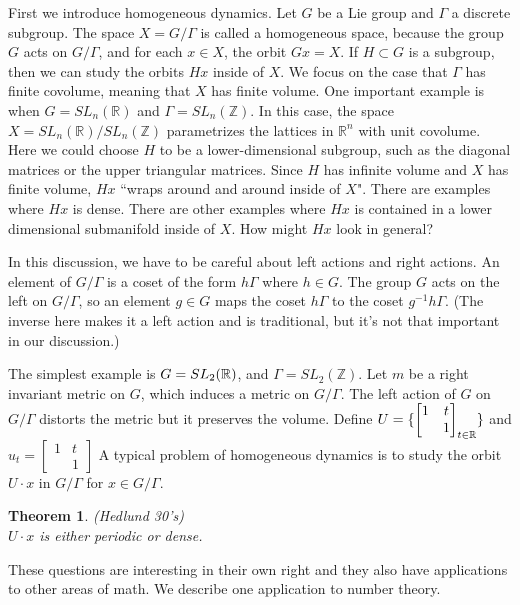\documentclass[12pt]{amsart}
\newtheorem{theorem}{Theorem}[section]
\newcommand{\ZZ}{\mathbb{Z}}
\newcommand{\RR}{\mathbb{R}}
\newcommand{\Z}{\mathbb{Z}}
\begin{document}
First we introduce homogeneous dynamics.   Let $G$ be a Lie group and $\Gamma$ a discrete subgroup.   The space $X = G / \Gamma$ is called a homogeneous space,  because the group $G$ acts on $G / \Gamma$,  and for each $x \in X$,  the orbit $G x = X$.   If $H \subset G$ is a subgroup, then we can study the orbits $H x$ inside of $X$.  We focus on the case that $\Gamma$ has finite covolume, meaning that $X$ has finite volume.  
One important example is when $G = SL_n(\RR)$ and $\Gamma = SL_n(\ZZ)$.  In this case, the space $X = SL_n(\RR) / SL_n(\ZZ)$ parametrizes the lattices in $\RR^n$ with unit covolume.  Here we could choose $H$ to be a lower-dimensional subgroup, such as the diagonal matrices or the upper triangular matrices.  Since $H$ has infinite volume and $X$ has finite volume, $H x$ ``wraps around and around inside of $X$".  There are examples where $H x$ is dense.  There are other examples where $H x$ is contained in a lower dimensional submanifold inside of $X$.  How might $H x$ look in general?

In this discussion,  we have to be careful about left actions and right actions.   An element of $G / \Gamma$ is a coset of the form $h \Gamma$ where $h \in G$.   The group $G$ acts on the left on $G/ \Gamma$,  so an element $g \in G$ maps the coset $h \Gamma$ to the coset $g^{-1} h \Gamma$.    (The inverse here makes it a left action and is traditional,  but it's not that important in our discussion.)

The simplest example is $G=SL_2(\mathbb{R})$, and $\Gamma=SL_2(\Z)$.   Let $m$ be a right invariant metric on $G$,  which induces a metric on $G/\Gamma$. The left action of $G$ on $G/\Gamma$ distorts the metric but it preserves the volume. 
Define $U=\{\begin{bmatrix}
  1 &t \\
    & 1
\end{bmatrix}_{t\in \mathbb{R}}\}$ and $u_t=\begin{bmatrix}
  1 &t \\
    & 1
\end{bmatrix}$
A typical problem of homogeneous dynamics is to study the orbit $U \cdot x$ in $G/\Gamma$ for $x \in G/\Gamma$. 
\begin{theorem}(Hedlund 30's)\\
$U\cdot x$ is either periodic or dense. 
\end{theorem}

These questions are interesting in their own right and they also have applications to other areas of math.  We describe one application to number theory.
\end{document}
